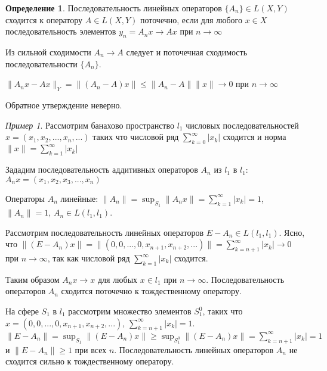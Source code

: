 \documentclass[12pt,a4paper,titlepage, oneside]{book}
\theoremstyle{definition}
\newtheorem*{definition}{Определение}
\theoremstyle{plain}
\theoremstyle{remark}
\theoremstyle{remark}
\newtheorem*{example}{Пример}
\theoremstyle{remark}
\theoremstyle{remark}
\theoremstyle{plain}
\theoremstyle{plain}
\begin{document}
\begin{definition}
Последовательность линейных операторов $\{A_n\}\in L(X,Y)$ сходится к оператору $A\in L(X,Y)$ поточечно, если для любого $x\in X$ последовательность элементов $y_n=A_nx\to Ax$ при $n\to \infty$
\end{definition}

Из сильной сходимости $A_n\to A$ следует и поточечная сходимость последовательности $\{A_n\}$.

\begin{center}
$\parallel A_nx-Ax\parallel_Y = \parallel(A_n-A)x\parallel\le \parallel A_n-A\parallel \parallel x\parallel\to 0$ при $n\to \infty$
\end{center}

Обратное утверждение неверно.

\begin{example}
Рассмотрим банахово пространство $l_1$ числовых последовательностей $x=(x_1,x_2,...,x_n,...)$ таких что числовой ряд $\displaystyle\sum_{k=0}^\infty \lvert x_k\rvert $ сходится и норма $\parallel x\parallel=\displaystyle\sum_{k=1}^\infty \lvert x_k\rvert $

Зададим последовательность аддитивных операторов $A_n$ из $l_1$ в $l_1$:
$A_nx=(x_1,x_2,x_3,...,x_n)$

Операторы $A_n$ линейные:
$\parallel A_n\parallel=\sup_{S_1} \parallel A_nx\parallel=\displaystyle\sum_{k=1}^\infty \lvert x_k\rvert =1$, $\parallel A_n\parallel=1$, $A_n\in L(l_1,l_1)$.

Рассмотрим последовательность линейных операторов $E-A_n\in L(l_1,l_1)$. Ясно, что $\parallel(E-A_n)x\parallel=\parallel(0,0,...,0,x_{n+1},x_{n+2},...)\parallel=\displaystyle\sum_{k=n+1}^\infty \lvert x_k\rvert  \to 0$ при $n\to \infty$, так как числовой ряд $\displaystyle\sum_{k=1}^\infty \lvert x_k\rvert $ сходится.

Таким образом $A_nx\to x$ для любых $x\in l_1$ при $n\to \infty$. Последовательность операторов $A_n$ сходится поточечно к тождественному оператору.

На сфере $S_1$ в $l_1$ рассмотрим множество элементов $S_1^0$, таких что $x=(0,0,...,0,x_{n+1},x_{n+2},...)$, $\displaystyle\sum_{k=n+1}^\infty \lvert x_k\rvert=1$.
$\parallel E-A_n\parallel=\sup_{S_1} \parallel(E-A_n)x\parallel\ge \sup_{S_1^0} \parallel(E-A_n)x\parallel=\displaystyle\sum_{k=n+1}^\infty \lvert x_k\rvert=1$ и $\parallel E-A_n\parallel\ge 1$ при всех $n$. Последовательность линейных операторов $A_n$ не сходится сильно к тождественному оператору.

\end{example}
\end{document}
